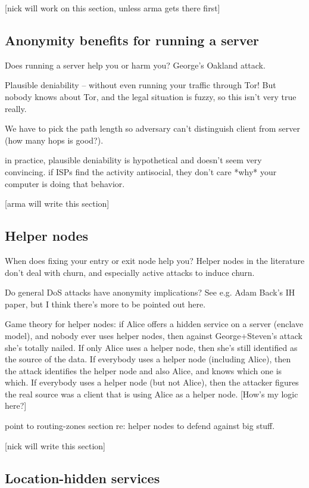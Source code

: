 \documentclass{llncs}
\begin{document}
[nick will work on this section, unless arma gets there first]

\subsection{Anonymity benefits for running a server}

Does running a server help you or harm you? George's Oakland attack.

Plausible deniability -- without even running your traffic through Tor!
But nobody knows about Tor, and the legal situation is fuzzy, so this
isn't very true really.

We have to pick the path length so adversary can't distinguish client from
server (how many hops is good?).

in practice, plausible deniability is hypothetical and doesn't seem very
convincing. if ISPs find the activity antisocial, they don't care *why*
your computer is doing that behavior.

[arma will write this section]

\subsection{Helper nodes}

When does fixing your entry or exit node help you?
Helper nodes in the literature don't deal with churn, and
especially active attacks to induce churn.

Do general DoS attacks have anonymity implications? See e.g. Adam
Back's IH paper, but I think there's more to be pointed out here.

Game theory for helper nodes: if Alice offers a hidden service on a
server (enclave model), and nobody ever uses helper nodes, then against
George+Steven's attack she's totally nailed. If only Alice uses a helper
node, then she's still identified as the source of the data. If everybody
uses a helper node (including Alice), then the attack identifies the
helper node and also Alice, and knows which one is which. If everybody
uses a helper node (but not Alice), then the attacker figures the real
source was a client that is using Alice as a helper node. [How's my
logic here?]

point to routing-zones section re: helper nodes to defend against
big stuff.

[nick will write this section]

\subsection{Location-hidden services}
\end{document}
